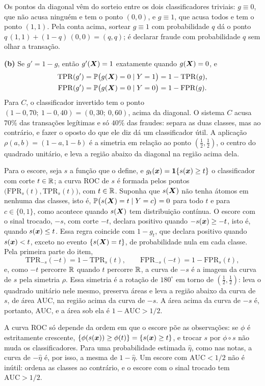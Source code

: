 \begin{solucao}
Os pontos da diagonal vêm do sorteio entre os dois classificadores triviais: $g\equiv0$, que
não acusa ninguém e tem o ponto $(0,0)$, e $g\equiv1$, que acusa todos e tem o ponto $(1,1)$.
Pela conta acima, sortear $g\equiv1$ com probabilidade $q$ dá o ponto
$q\,(1,1)+(1-q)\,(0,0)=(q,q)$; é declarar fraude com probabilidade $q$ sem olhar a transação.

\smallskip
\textbf{(b)} Se $g'=1-g$, então $g'(\bm{X})=1$ exatamente quando $g(\bm{X})=0$, e
\begin{align*}
  \mathrm{TPR}(g')&=\mathbb{P}\big(g(\bm{X})=0\mid Y=1\big)=1-\mathrm{TPR}(g),\\
  \mathrm{FPR}(g')&=\mathbb{P}\big(g(\bm{X})=0\mid Y=0\big)=1-\mathrm{FPR}(g).
\end{align*}
Para $C$, o classificador invertido tem o ponto $(1-0{,}70;\ 1-0{,}40)=(0{,}30;\ 0{,}60)$,
acima da diagonal. O sistema $C$ acusa $70\%$ das transações legítimas e só $40\%$ das
fraudes: separa as duas classes, mas ao contrário, e fazer o oposto do que ele diz dá um
classificador útil. A aplicação $\rho(a,b)=(1-a,1-b)$ é a simetria em relação ao ponto
$(\tfrac12,\tfrac12)$, o centro do quadrado unitário, e leva a região abaixo da diagonal na
região acima dela.

Para o escore, seja $s$ a função que o define, e $g_t(\bm{x})=\mathbf{1}\!\left\{s(\bm{x})\ge t\right\}$ o classificador com
corte $t\in\mathbb{R}$; a curva ROC de $s$ é formada pelos pontos
$\big(\mathrm{FPR}_s(t),\mathrm{TPR}_s(t)\big)$, com $t\in\mathbb{R}$. Suponha que $s(\bm{X})$ não tenha
átomos em nenhuma das classes, isto é, $\mathbb{P}\big(s(\bm{X})=t\mid Y=c\big)=0$ para todo $t$ e para
$c\in\{0,1\}$, como acontece quando $s(\bm{X})$ tem distribuição contínua. O escore com o sinal
trocado, $-s$, com corte $-t$, declara positivo quando $-s(\bm{x})\ge-t$, isto é, quando
$s(\bm{x})\le t$. Essa regra coincide com $1-g_t$, que declara positivo quando $s(\bm{x})<t$, exceto no
evento $\{s(\bm{X})=t\}$, de probabilidade nula em cada classe. Pela primeira parte do item,
\[
  \mathrm{TPR}_{-s}(-t)=1-\mathrm{TPR}_s(t),
  \qquad
  \mathrm{FPR}_{-s}(-t)=1-\mathrm{FPR}_s(t),
\]
e, como $-t$ percorre $\mathbb{R}$ quando $t$ percorre $\mathbb{R}$, a curva de $-s$ é a imagem da curva de $s$
pela simetria $\rho$. Essa simetria é a rotação de $180^\circ$ em torno de $(\tfrac12,\tfrac12)$:
leva o quadrado unitário nele mesmo, preserva áreas e leva a região abaixo da curva de $s$, de
área $\mathrm{AUC}$, na região acima da curva de $-s$. A área acima da curva de $-s$ é, portanto,
$\mathrm{AUC}$, e a área sob ela é $1-\mathrm{AUC}>1/2$.

A curva ROC só depende da ordem em que o escore põe as observações: se $\phi$ é estritamente
crescente, $\{\phi(s(\bm{x}))\ge\phi(t)\}=\{s(\bm{x})\ge t\}$, e trocar $s$ por $\phi\circ s$ não muda os
classificadores. Para uma probabilidade estimada $\widehat\eta$, como nas notas, a curva de
$-\widehat\eta$ é, por isso, a mesma de $1-\widehat\eta$. Um escore com $\mathrm{AUC}<1/2$ não é
inútil: ordena as classes ao contrário, e o escore com o sinal trocado tem
$\mathrm{AUC}>1/2$.


\end{solucao}
